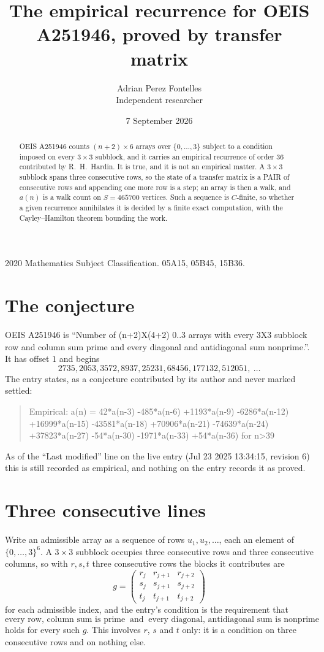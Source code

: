 \documentclass[11pt,a4paper]{article}
\title{The empirical recurrence for OEIS A251946, proved by transfer matrix}
\author{Adrian Perez Fontelles\\ \small Independent researcher}
\date{7 September 2026}
\theoremstyle{plain}
\theoremstyle{definition}
\begin{document}
\maketitle

\begin{abstract}
OEIS A251946 counts $(n+2)\times6$ arrays over $\{0,\dots,3\}$ subject to a condition imposed on
every $3\times3$ subblock, and it carries an empirical recurrence of order $36$
contributed by R.~H.~Hardin. It is true, and it is not an empirical matter. A $3\times3$
subblock spans three consecutive rows, so the state of a transfer matrix is a PAIR of
consecutive rows and appending one more row is a step; an array is then a walk, and
$a(n)$ is a walk count on $S=465700$ vertices. Such a sequence is $C$-finite, so whether a given
recurrence annihilates it is decided by a finite exact computation, with the Cayley--Hamilton
theorem bounding the work.
\end{abstract}

\noindent\small 2020 Mathematics Subject Classification. 05A15, 05B45, 15B36.\normalsize

\section{The conjecture}

OEIS A251946 is ``Number of (n+2)X(4+2) 0..3 arrays with every 3X3 subblock row and column sum prime and every diagonal and antidiagonal sum nonprime.''. It has offset $1$ and begins
\[
2735, 2053, 3572, 8937, 25231, 68456, 177132, 512051,\ \dots
\]
The entry states, as a conjecture contributed by its author and never marked settled:
\begin{quote}
Empirical: a(n) = 42*a(n-3) -485*a(n-6) +1193*a(n-9) -6286*a(n-12) +16999*a(n-15) -43581*a(n-18) +70906*a(n-21) -74639*a(n-24) +37823*a(n-27) -54*a(n-30) -1971*a(n-33) +54*a(n-36) for n>39
\end{quote}
As of the ``Last modified'' line on the live entry (Jul 23 2025 13:34:15, revision 6) this is still
recorded as empirical, and nothing on the entry records it as proved.

\section{Three consecutive lines}

Write an admissible array as a sequence of rows $u_1,u_2,\dots$, each an element of
$\{0,\dots,3\}^{6}$. A $3\times3$ subblock occupies three consecutive rows and
three consecutive columns, so with $r,s,t$ three consecutive rows the blocks it
contributes are
\[
g=\begin{pmatrix}r_j&r_{j+1}&r_{j+2}\\ s_j&s_{j+1}&s_{j+2}\\ t_j&t_{j+1}&t_{j+2}\end{pmatrix}
\]
for each admissible index, and the entry's condition is the requirement that
\[
\text{every row, column sum is prime}\ \text{ and }\ \text{every diagonal, antidiagonal sum is nonprime}
\]
holds for every such $g$. This involves $r$, $s$ and $t$ only: it is a condition on
three consecutive rows and on nothing else.
\end{document}
